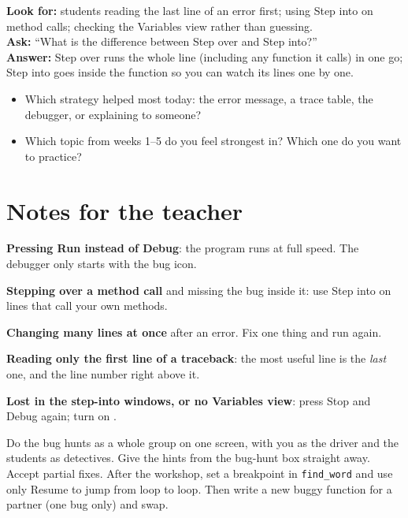 \begin{formativecheck}
\textbf{Look for:} students reading the last line of an error first; using Step into on method calls; checking the Variables view rather than guessing.\\
\textbf{Ask:} \enquote{What is the difference between Step over and Step into?}\\
\textbf{Answer:} Step over runs the whole line (including any function it calls) in one go; Step into goes inside the function so you can watch its lines one by one.
\end{formativecheck}

\begin{reflection}
\begin{itemize}[itemsep=1pt]
  \item Which strategy helped most today: the error message, a trace table, the debugger, or explaining to someone?
  \item Which topic from weeks 1--5 do you feel strongest in? Which one do you want to practice?
\end{itemize}
\end{reflection}

\section{Notes for the teacher}
\begin{commonmistakes}
  \item \textbf{Pressing Run instead of Debug}: the program runs at full speed. The debugger only starts with the bug icon.
  \item \textbf{Stepping over a method call} and missing the bug inside it: use Step into on lines that call your own methods.
  \item \textbf{Changing many lines at once} after an error. Fix one thing and run again.
  \item \textbf{Reading only the first line of a traceback}: the most useful line is the \emph{last} one, and the line number right above it.
  \item \textbf{Lost in the step-into windows, or no Variables view}: press Stop and Debug again; turn on .
\end{commonmistakes}

\begin{differentiation}
\supportpath Do the bug hunts as a whole group on one screen, with you as the driver and the students as detectives. Give the hints from the bug-hunt box straight away. Accept partial fixes.
\extensionpath After the workshop, set a breakpoint in \texttt{find\_word} and use only Resume to jump from loop to loop. Then write a new buggy function for a partner (one bug only) and swap.
\end{differentiation}

